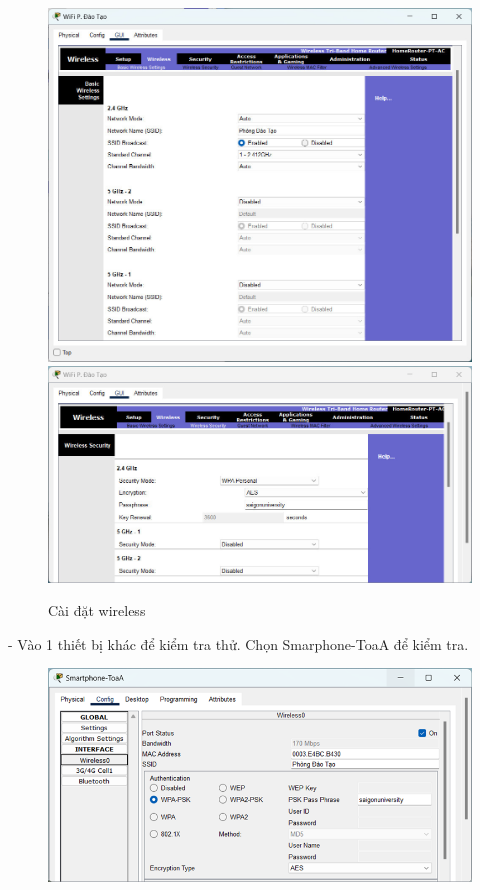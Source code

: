 \documentclass[12pt, a4paper]{article}
\begin{document}
\begin{flushleft}
\begin{figure}[H]
			\includegraphics[width=1\textwidth]{wifi_wlc.jpg}            	\includegraphics[width=1\textwidth]{wifi_wlc_security.jpg}
			\caption{Cài đặt wireless}
		\end{figure}
		\newpage
		- Vào 1 thiết bị khác để kiểm tra thử. Chọn Smarphone-ToaA để kiểm tra.
		\begin{figure}[H]
			\centering
			\includegraphics[width=1\textwidth]{test-wifi-1.png}

\end{figure}
\end{flushleft}
\end{document}
